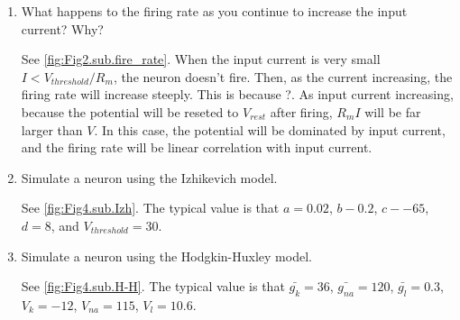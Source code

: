 \documentclass[11pt]{article}
\begin{document}
\begin{enumerate}
		\item What happens to the firing rate as you continue to increase the input current? Why?
		
		See \ref{fig:Fig2.sub.fire_rate}. When the input current is very small $I < V_{threshold}/R_m$, the neuron doesn't fire. Then, as the current increasing, the firing rate will increase steeply. This is because ?. As input current increasing, because the potential will be reseted to $V_{rest}$ after firing, $R_mI$ will be far larger than $V$. In this case, the potential will be dominated by input current, and the firing rate will be linear correlation with input current.
		
		\item Simulate a neuron using the Izhikevich model.
		
		See \ref{fig:Fig4.sub.Izh}. The typical value is that $a = 0.02$, $b - 0.2$, $c - -65$, $d = 8$, and $V_{threshold} = 30$.
		
		\item Simulate a neuron using the Hodgkin-Huxley model.
		
		See \ref{fig:Fig4.sub.H-H}. The typical value is that $\bar{g_k} = 36$, $\bar{g_{na}} = 120$, $\bar{g_l} = 0.3$, $V_k = -12$, $V_{na} = 115$, $V_l = 10.6$.
		

\end{enumerate}
\end{document}
